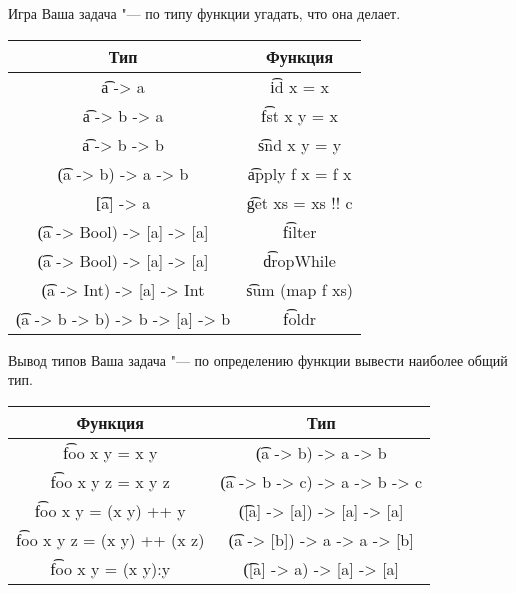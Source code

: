 \begin{frame}{Игра}
	Ваша задача "--- по типу функции угадать, что она делает.
	\begin{tabular}{c|c}
		\centering
		Тип & Функция \\\hline
		\t{a -> a} & \pause\t{id x = x} \\\pause
		\t{a -> b -> a} & \pause\t{fst x y = x} \\\pause
		\t{a -> b -> b} & \pause\t{snd x y = y} \\\pause
		\t{(a -> b) -> a -> b} & \pause\t{apply f x = f x} \\\pause
		\t{[a] -> a} & \pause\t{get xs = xs !! c} \\\pause
		\t{(a -> Bool) -> [a] -> [a]} & \pause\t{filter} \\\pause
		\t{(a -> Bool) -> [a] -> [a]} & \pause\t{dropWhile} \\\pause
		\t{(a -> Int) -> [a] -> Int} & \pause\t{sum (map f xs)} \\\pause
		\t{(a -> b -> b) -> b -> [a] -> b} & \pause\t{foldr}
	\end{tabular}
\end{frame}

\begin{frame}{Вывод типов}
	Ваша задача "--- по определению функции вывести наиболее общий тип.
	\begin{tabular}{c|c}
		\centering
		Функция & Тип \\\hline
		\t{foo x y = x y} & \pause \t{(a -> b) -> a -> b} \\\pause
		\t{foo x y z = x y z} & \pause \t{(a -> b -> c) -> a -> b -> c} \\\pause
		\t{foo x y = (x y) ++ y} & \pause \t{([a] -> [a]) -> [a] -> [a]} \\\pause
		\t{foo x y z = (x y) ++ (x z)} & \pause \t{(a -> [b]) -> a -> a -> [b]} \\\pause
		\t{foo x y = (x y):y} & \pause \t{([a] -> a) -> [a] -> [a]} \\
	\end{tabular}
\end{frame}


